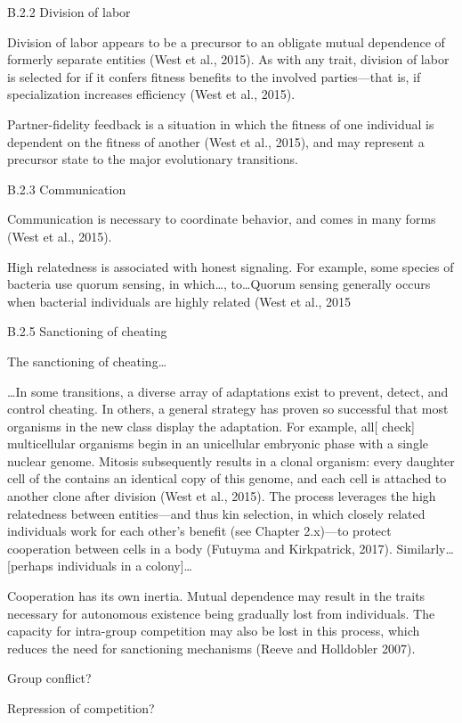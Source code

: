 \documentclass{tufte-book} %
\begin{document}
B.2.2 Division of labor

Division of labor appears to be a precursor to an obligate mutual dependence of formerly separate entities (West et al., 2015). As with any trait, division of labor is selected for if it confers fitness benefits to the involved parties—that is, if specialization increases efficiency (West et al., 2015). 

Partner-fidelity feedback is a situation in which the fitness of one individual is dependent on the fitness of another (West et al., 2015), and may  represent a precursor state to the major evolutionary transitions.

B.2.3 Communication

Communication is necessary to coordinate behavior, and comes in many forms (West et al., 2015).

High relatedness is associated with honest signaling. For example, some species of bacteria use quorum sensing, in which…, to…Quorum sensing generally occurs when bacterial individuals are highly related (West et al., 2015

B.2.5 Sanctioning of cheating 

The sanctioning of cheating…

…In some transitions, a diverse array of adaptations exist to prevent, detect, and control cheating. In others, a general strategy has proven so successful that most organisms in the new class display the adaptation. For example, all[ check] multicellular organisms begin in an unicellular embryonic phase with a single nuclear genome. Mitosis subsequently  results in a clonal organism: every daughter cell of the  contains an identical copy of this genome, and each cell is attached to another clone after division (West et al., 2015). The process leverages the high relatedness between entities—and thus kin selection, in which closely related individuals work for each other’s benefit (see Chapter 2.x)—to protect cooperation between cells in a body (Futuyma and Kirkpatrick, 2017). 
Similarly…[perhaps individuals in a colony]…

Cooperation has its own inertia. Mutual dependence may result in the traits necessary for autonomous existence being gradually lost from individuals. The capacity for intra-group competition may also be lost in this process, which reduces the need for sanctioning mechanisms (Reeve and Holldobler 2007). 



Group conflict?

Repression of competition?
\end{document}
